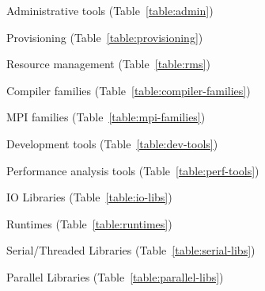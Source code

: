 \vspace*{0.1cm}

\begin{itemize*}
\item Administrative tools (Table~\ref{table:admin})
\item Provisioning (Table~\ref{table:provisioning})
\fi
\item Resource management (Table~\ref{table:rms})
\item Compiler families (Table~\ref{table:compiler-families})
\item MPI families (Table~\ref{table:mpi-families})
\item Development tools (Table~\ref{table:dev-tools})
\item Performance analysis tools (Table~\ref{table:perf-tools})
\item IO Libraries (Table~\ref{table:io-libs})
\item Runtimes (Table~\ref{table:runtimes})
\item Serial/Threaded Libraries (Table~\ref{table:serial-libs})
\item Parallel Libraries (Table~\ref{table:parallel-libs})
\end{itemize*}
